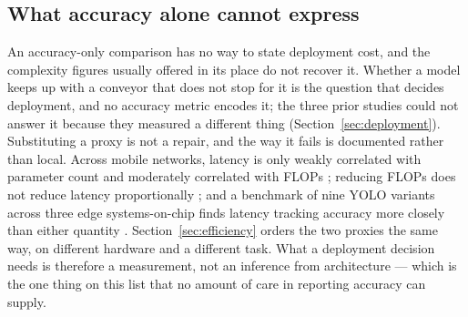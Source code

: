 \subsection{What accuracy alone cannot express}
\label{sec:speed-changes-the-answer}

An accuracy-only comparison has no way to state deployment cost, and the
complexity figures usually offered in its place do not recover it. Whether a
model keeps up with a conveyor that does not stop for it is the question that
decides deployment, and no accuracy metric encodes it; the three prior studies
could not answer it because they measured a different thing
(Section~\ref{sec:deployment}). Substituting a proxy is not a repair, and the way it
fails is documented rather than local. Across mobile networks, latency is only
weakly correlated with parameter count and moderately correlated with FLOPs
\citep{vasu2023mobileone}; reducing FLOPs does not reduce latency
proportionally \citep{chen2023run}; and a benchmark of nine YOLO variants
across three edge systems-on-chip finds latency tracking accuracy more closely
than either quantity \citep{kong2026edge}. Section~\ref{sec:efficiency} orders
the two proxies the same way, on different hardware and a different task. What a deployment decision needs is therefore a measurement, not an
inference from architecture --- which is the one thing on this list that no
amount of care in reporting accuracy can supply.
